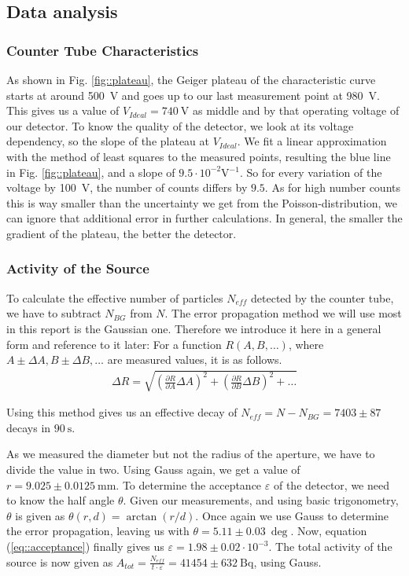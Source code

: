 \subsection{Data analysis}
\subsubsection{Counter Tube Characteristics}
As shown in Fig. \ref{fig::plateau}, the Geiger plateau of the characteristic curve starts at around \SI{500}{\volt} and goes up to our last measurement point at \SI{980}{\volt}. 
This gives us a value of $V_{Ideal} = \SI{740}{\volt}$ as middle and by that operating voltage of our detector.
To know the quality of the detector, we look at its voltage dependency, so the slope of the plateau at $V_{Ideal}$.
We fit a linear approximation with the method of least squares to the measured points, resulting the blue line in Fig. \ref{fig::plateau}, and a slope of $9.5 \cdot 10^{-2} \si{\volt^{-1}}$.
So for every variation of the voltage by \SI{100}{\volt}, the number of counts differs by $9.5$.
As for high number counts this is way smaller than the uncertainty we get from the Poisson-distribution, we can ignore that additional error in further calculations.
In general, the smaller the gradient of the plateau, the better the detector.

\subsubsection{Activity of the Source}
To calculate the effective number of particles $N_{eff}$ detected by the counter tube, we have to subtract $N_{BG}$ from $N$.
The error propagation method we will use most in this report is the Gaussian one. 
Therefore we introduce it here in a general form and reference to it later:
For a function $R(A, B, \dots)$, where $A \pm \Delta A, B \pm \Delta B, \dots$ are measured values, it is as follows.
\begin{align}
	\Delta R = \sqrt{\left(\frac{\partial R}{\partial A} \Delta A\right)^2 + \left(\frac{\partial R}{\partial B} \Delta B\right)^2 + \dots}
	\label{eq::gauss}
\end{align}

Using this method gives us an effective decay of $N_{eff} = N - N_{BG} = 7403 \pm 87$ decays in $\SI{90}{\second}$.

As we measured the diameter but not the radius of the aperture, we have to divide the value in two.
Using Gauss again, we get a value of $r = 9.025 \pm \SI{0.0125}{\milli\meter}$.
To determine the acceptance $\varepsilon$ of the detector, we need to know the half angle $\theta$.
Given our measurements, and using basic trigonometry, $\theta$ is given as $\theta (r, d) = \arctan(r/d)$.
Once again we use Gauss to determine the error propagation, leaving us with $\theta = 5.11 \pm \SI{0.03}{\deg}$.
Now, equation (\ref{eq::acceptance}) finally gives us $\varepsilon = 1.98 \pm 0.02 \cdot 10^{-3}$.
The total activity of the source is now given as $A_{tot} = \frac{N_{eff}}{t \cdot \varepsilon} = 41454 \pm \SI{632}{\becquerel}$, using Gauss.


